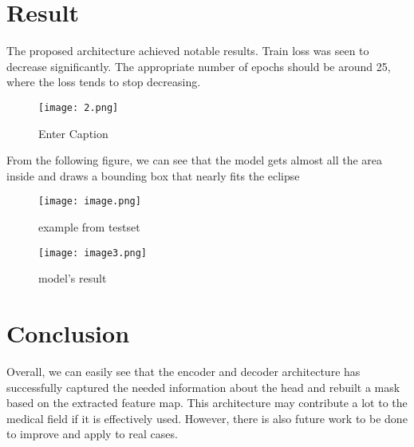 \documentclass[twocolumn]{report}
\begin{document}
\chapter{Result}
The proposed architecture achieved notable results. Train loss was seen to decrease significantly. The appropriate number of epochs should be around 25, where the loss tends to stop decreasing.
\begin{figure}[H]
    \centering
    \texttt{[image: 2.png]}
    \caption{Enter Caption}
    \label{fig:enter-label}
\end{figure}
From the following figure, we can see that the model gets almost all the area inside and draws a bounding box that nearly fits the eclipse
\begin{figure}[H]
  \centering
  \begin{minipage}[b]{0.4\textwidth}
    \texttt{[image: image.png]}
    \caption{example from testset}
  \end{minipage}
  \hfill
  \centering
  \begin{minipage}[b]{0.4\textwidth}
    \texttt{[image: image3.png]}
    \caption{model's result}
  \end{minipage}
\end{figure}
\chapter{Conclusion}
Overall, we can easily see that the encoder and decoder architecture has successfully captured the needed information about the head and rebuilt a mask based on the extracted feature map. This architecture may contribute a lot to the medical field if it is effectively used. However, there is also future work to be done to improve and apply to real cases. 
\end{document}
